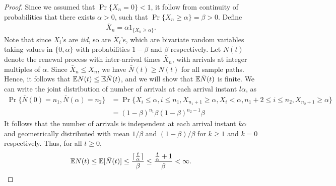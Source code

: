 \documentclass[a4paper,10pt, english]{article}
\begin{document}
\begin{proof}
Since we assumed that $\Pr\{X_n = 0\} < 1$, it follow from continuity of probabilities that there exists $\alpha > 0$, such that $\Pr\{X_n \geq \alpha\} = \beta >0$. Define
\begin{align*}
\bar{X}_n = \alpha 1_{\{X_n \geq \alpha\}}.
\end{align*}
Note that since $X_i$'s are \textit{iid}, so are $\bar{X}_i$'s, which are bivariate random variables taking values in $\{0, \alpha\}$ with probabilities $1-\beta$ and $\beta$ respectively. %
Let $\bar{N}(t)$ denote the renewal process with inter-arrival times $\bar{X}_n$, with arrivals at integer multiples of $\alpha$. 
Since $\bar{X}_n \leq X_n$, we have $\bar{N}(t) \geq N(t)$ for all sample paths. 
Hence, it follows that $\mathbb{E} N(t) \leq \mathbb{E} \bar{N}(t)$, and we will show that $\mathbb{E}\bar{N}(t)$ is finite. 
We can write the joint distribution of number of arrivals at each arrival instant $l\alpha$, as 
\begin{align*}
\Pr\{\bar{N}(0)=n_1, \bar{N}(\alpha) = n_2\} &= \Pr\{X_i \leq \alpha, i \leq n_1, X_{n_1+1} \geq \alpha, X_i < \alpha, n_1 +2 \leq i \leq n_2, X_{n_2+1} \geq \alpha \}\\
&=  (1-\beta)^{n_1}\beta(1-\beta)^{n_2-1}\beta
\end{align*}
It follows that the number of arrivals is independent at each arrival instant $k\alpha$ and geometrically distributed with mean $1/\beta$ and $(1-\beta)/\beta$ for $k \geq 1$ and $k = 0$ respectively.  
Thus, for all $t \geq 0$, 
\begin{align*}
\mathbb{E} N(t) \leq \mathbb{E}[\bar{N}(t)] \leq \frac{\lceil\frac{t}{\alpha} \rceil}{\beta} \leq \frac{\frac{t}{\alpha} + 1}{\beta} < \infty.
\end{align*}
\end{proof} 
\end{document}
